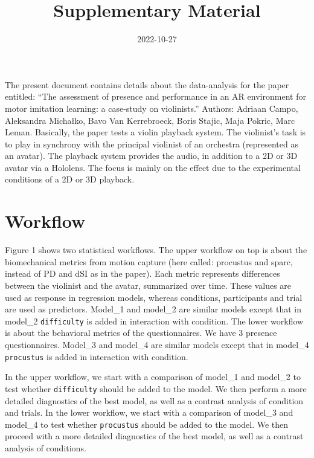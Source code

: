 \documentclass[
]{article}
\title{Supplementary Material}
\author{}
\date{\vspace{-2.5em}2022-10-27}
\begin{document}
\maketitle

The present document contains details about the data-analysis for the
paper entitled: ``The assessment of presence and performance in an AR
environment for motor imitation learning: a case-study on violinists.''
Authors: Adriaan Campo, Aleksandra Michałko, Bavo Van Kerrebroeck, Boris
Stajic, Maja Pokric, Marc Leman. Basically, the paper tests a violin
playback system. The violinist's task is to play in synchrony with the
principal violinist of an orchestra (represented as an avatar). The
playback system provides the audio, in addition to a 2D or 3D avatar via
a Hololens. The focus is mainly on the effect due to the experimental
conditions of a 2D or 3D playback.

\hypertarget{workflow}{%
\section{Workflow}\label{workflow}}

Figure 1 shows two statistical workflows. The upper workflow on top is
about the biomechanical metrics from motion capture (here called:
procustus and sparc, instead of PD and dSI as in the paper). Each metric
represents differences between the violinist and the avatar, summarized
over time. These values are used as response in regression models,
whereas conditions, participants and trial are used as predictors.
Model\_1 and model\_2 are similar models except that in model\_2
\texttt{difficulty} is added in interaction with condition. The lower
workflow is about the behavioral metrics of the questionnaires. We have
3 presence questionnaires. Model\_3 and model\_4 are similar models
except that in model\_4 \texttt{procustus} is added in interaction with
condition.

In the upper workflow, we start with a comparison of model\_1 and
model\_2 to test whether \texttt{difficulty} should be added to the
model. We then perform a more detailed diagnostics of the best model, as
well as a contrast analysis of condition and trials. In the lower
workflow, we start with a comparison of model\_3 and model\_4 to test
whether \texttt{procustus} should be added to the model. We then proceed
with a more detailed diagnostics of the best model, as well as a
contrast analysis of conditions.
\end{document}

